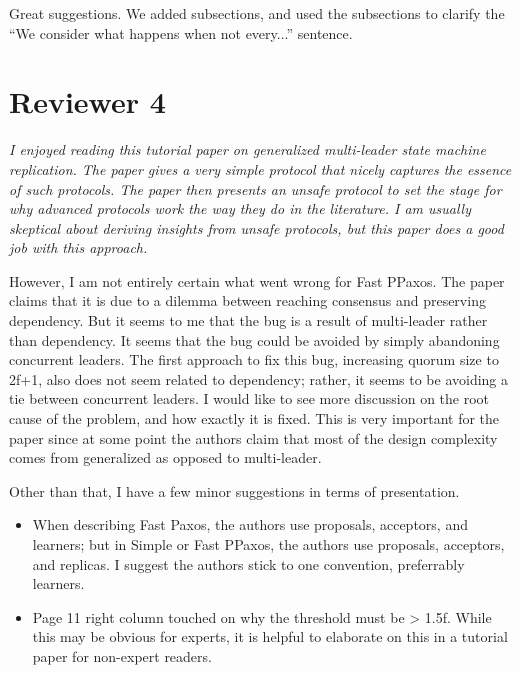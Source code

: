 \documentclass[letterpaper,twocolumn,10pt]{article}
\newenvironment{reviewerquote}
{\list{}{\leftmargin=\parindent\rightmargin=0in}\item[] \itshape \color{ReviewerDarkGray}}%
{\endlist}
\begin{document}
Great suggestions. We added subsections, and used the subsections to clarify
the ``We consider what happens when not every...'' sentence.

\section*{Reviewer 4}
\begin{reviewerquote}
  I enjoyed reading this tutorial paper on generalized multi-leader state
  machine replication. The paper gives a very simple protocol that nicely
  captures the essence of such protocols. The paper then presents an unsafe
  protocol to set the stage for why advanced protocols work the way they do in
  the literature. I am usually skeptical about deriving insights from unsafe
  protocols, but this paper does a good job with this approach.

  However, I am not entirely certain what went wrong for Fast PPaxos. The paper
  claims that it is due to a dilemma between reaching consensus and preserving
  dependency. But it seems to me that the bug is a result of multi-leader
  rather than dependency. It seems that the bug could be avoided by simply
  abandoning concurrent leaders. The first approach to fix this bug, increasing
  quorum size to 2f+1, also does not seem related to dependency; rather, it
  seems to be avoiding a tie between concurrent leaders. I would like to see
  more discussion on the root cause of the problem, and how exactly it is
  fixed. This is very important for the paper since at some point the authors
  claim that most of the design complexity comes from generalized as opposed to
  multi-leader.

  Other than that, I have a few minor suggestions in terms of presentation.

  \begin{itemize}
    \item
      When describing Fast Paxos, the authors use proposals, acceptors, and
      learners; but in Simple or Fast PPaxos, the authors use proposals,
      acceptors, and replicas. I suggest the authors stick to one convention,
      preferrably learners.
  \end{itemize}

  \begin{itemize}
    \item
      Page 11 right column touched on why the threshold must be > 1.5f. While
      this may be obvious for experts, it is helpful to elaborate on this in a
      tutorial paper for non-expert readers.
  \end{itemize}


\end{reviewerquote}
\end{document}
